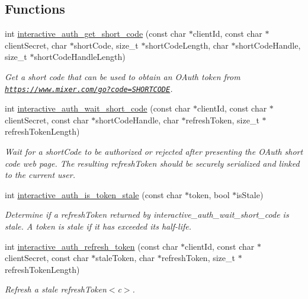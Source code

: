 \subsection*{Functions}
\begin{DoxyCompactItemize}
\item 
int \mbox{\hyperlink{group__interactivity_ga933fa6f40b4d9728b20286badcf0b4f5}{interactive\+\_\+auth\+\_\+get\+\_\+short\+\_\+code}} (const char $\ast$client\+Id, const char $\ast$client\+Secret, char $\ast$short\+Code, size\+\_\+t $\ast$short\+Code\+Length, char $\ast$short\+Code\+Handle, size\+\_\+t $\ast$short\+Code\+Handle\+Length)
\begin{DoxyCompactList}\small\item\em Get a short code that can be used to obtain an O\+Auth token from {\ttfamily \href{https://www.mixer.com/go?code=SHORTCODE}{\tt https\+://www.\+mixer.\+com/go?code=\+S\+H\+O\+R\+T\+C\+O\+DE}}. \end{DoxyCompactList}\item 
int \mbox{\hyperlink{group__interactivity_ga16c877f68b6ff400719fc50e3c824a83}{interactive\+\_\+auth\+\_\+wait\+\_\+short\+\_\+code}} (const char $\ast$client\+Id, const char $\ast$client\+Secret, const char $\ast$short\+Code\+Handle, char $\ast$refresh\+Token, size\+\_\+t $\ast$refresh\+Token\+Length)
\begin{DoxyCompactList}\small\item\em Wait for a {\ttfamily short\+Code} to be authorized or rejected after presenting the O\+Auth short code web page. The resulting {\ttfamily refresh\+Token} should be securely serialized and linked to the current user. \end{DoxyCompactList}\item 
int \mbox{\hyperlink{group__interactivity_gadc0bce85838a4ef26479f05cee15ce3f}{interactive\+\_\+auth\+\_\+is\+\_\+token\+\_\+stale}} (const char $\ast$token, bool $\ast$is\+Stale)
\begin{DoxyCompactList}\small\item\em Determine if a {\ttfamily refresh\+Token} returned by {\ttfamily interactive\+\_\+auth\+\_\+wait\+\_\+short\+\_\+code} is stale. A token is stale if it has exceeded its half-\/life. \end{DoxyCompactList}\item 
int \mbox{\hyperlink{group__interactivity_ga13cfa6f76168be83cf29602bdcf1d0fc}{interactive\+\_\+auth\+\_\+refresh\+\_\+token}} (const char $\ast$client\+Id, const char $\ast$client\+Secret, const char $\ast$stale\+Token, char $\ast$refresh\+Token, size\+\_\+t $\ast$refresh\+Token\+Length)
\begin{DoxyCompactList}\small\item\em Refresh a stale {\ttfamily refresh\+Token$<$c$>$. }


\end{DoxyCompactList}
\end{DoxyCompactItemize}
